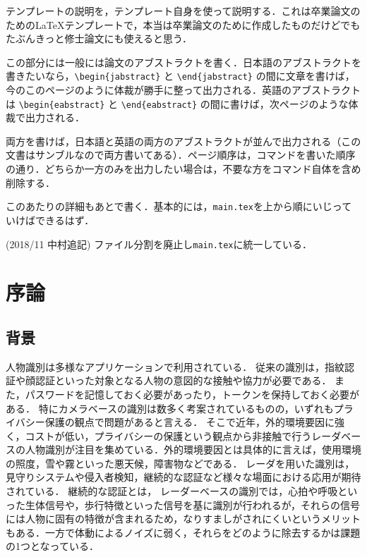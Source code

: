 \begin{jabstract}

テンプレートの説明を，テンプレート自身を使って説明する．これは卒業論文のための\LaTeX テンプレートで，本当は卒業論文のために作成したものだけどでもたぶんきっと修士論文にも使えると思う．

この部分には一般には論文のアブストラクトを書く．日本語のアブストラクトを書きたいなら，\verb|\begin{jabstract}| と \verb|\end{jabstract}| の間に文章を書けば，今のこのページのように体裁が勝手に整って出力される．英語のアブストラクトは \verb|\begin{eabstract}| と \verb|\end{eabstract}| の間に書けば，次ページのような体裁で出力される．

両方を書けば，日本語と英語の両方のアブストラクトが並んで出力される（この文書はサンブルなので両方書いてある）．ページ順序は，コマンドを書いた順序の通り．どちらか一方のみを出力したい場合は，不要な方をコマンド自体を含め削除する．

このあたりの詳細もあとで書く．基本的には，{\tt main.tex}を上から順にいじっていけばできるはず．

(2018/11 中村追記) ファイル分割を廃止し{\tt main.tex}に統一している．

\end{jabstract}

\tableofcontents	%
\listoffigures		%
\listoftables		%


\chapter{序論}

\section{背景}
人物識別は多様なアプリケーションで利用されている．
従来の識別は，指紋認証や顔認証といった対象となる人物の意図的な接触や協力が必要である．
また，パスワードを記憶しておく必要があったり，トークンを保持しておく必要がある\cite{paper:password}．
特にカメラベースの識別は数多く考案されているものの，いずれもプライバシー保護の観点で問題があると言える．
そこで近年，外的環境要因に強く，コストが低い，プライバシーの保護という観点から非接触で行うレーダベースの人物識別が注目を集めている．外的環境要因とは具体的に言えば，使用環境の照度，雪や霧といった悪天候，障害物などである．
レーダを用いた識別は，見守りシステムや侵入者検知，継続的な認証など様々な場面における応用が期待されている．
継続的な認証とは，
レーダーベースの識別では，心拍や呼吸といった生体信号や，歩行特徴といった信号を基に識別が行われるが，それらの信号には人物に固有の特徴が含まれるため，なりすましがされにくいというメリットもある．一方で体動によるノイズに弱く，それらをどのように除去するかは課題の1つとなっている．

